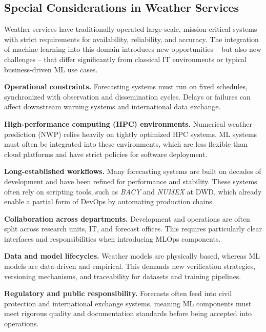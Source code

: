 %
\subsection{Special Considerations in Weather Services}

Weather services have traditionally operated large-scale, mission-critical systems with strict requirements for availability, reliability, and accuracy. The integration of machine learning into this domain introduces new opportunities -- but also new challenges -- that differ significantly from classical IT environments or typical business-driven ML use cases.

{\bf Operational constraints.} Forecasting systems must run on fixed schedules, synchronized with observation and dissemination cycles. Delays or failures can affect downstream warning systems and international data exchange.

{\bf High-performance computing (HPC) environments.} Numerical weather prediction (NWP) relies heavily on tightly optimized HPC systems. ML systems must often be integrated into these environments, which are less flexible than cloud platforms and have strict policies for software deployment.

{\bf Long-established workflows.} Many forecasting systems are built on decades of development and have been refined for performance and stability. These systems often rely on scripting tools, such as {\em BACY} and {\em NUMEX} at DWD, which already enable a partial form of DevOps by automating production chains.

{\bf Collaboration across departments.} Development and operations are often split across research units, IT, and forecast offices. This requires particularly clear interfaces and responsibilities when introducing MLOps components.

{\bf Data and model lifecycles.} Weather models are physically based, whereas ML models are data-driven and empirical. This demands new verification strategies, versioning mechanisms, and traceability for datasets and training pipelines.

{\bf Regulatory and public responsibility.} Forecasts often feed into civil protection and international exchange systems, meaning ML components must meet rigorous quality and documentation standards before being accepted into operations.

